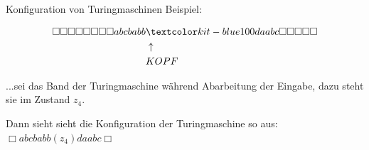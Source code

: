 \documentclass{beamer}
\begin{document}
\begin{frame}{Konfiguration von Turingmaschinen}
	Beispiel:
	
	\vspace{.2cm}
	
	\begin{align*}
	\Box\Box\Box\Box\Box\Box\Box\Box abcbabb&\markBlue{d}aabc \Box\Box\Box\Box\Box \\
	&\uparrow \\
	&KOPF
	\end{align*}
	
	\bp
	...sei das Band der Turingmaschine während Abarbeitung der Eingabe, dazu steht sie im Zustand $z_4$.
	
	\vspace{.2cm}
	
	\bp
	Dann sieht sieht die Konfiguration der Turingmaschine so aus: \ip $\Box abcbabb (z_4) daabc \Box$
\end{frame}
\end{document}
